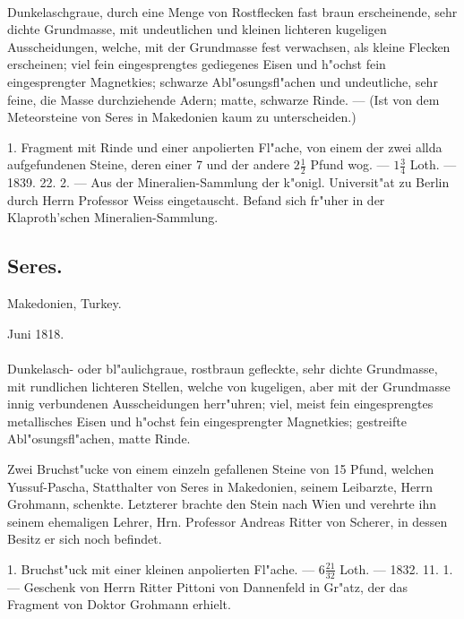 \documentclass[a4paper, 11pt, oneside, polutonikogreek, german]{article}
\begin{document}
\paragraph{}
Dunkelaschgraue, durch eine Menge von Rostflecken fast braun erscheinende, sehr dichte Grundmasse, mit undeutlichen und kleinen lichteren kugeligen Ausscheidungen, welche, mit der Grundmasse fest verwachsen, als kleine Flecken erscheinen; viel fein eingesprengtes gediegenes Eisen und h"ochst fein eingesprengter Magnetkies; schwarze Abl"osungsfl"achen und undeutliche, sehr feine, die Masse durchziehende Adern; matte, schwarze Rinde. --- (Ist von dem Meteorsteine von Seres in Makedonien kaum zu unterscheiden.)

1. Fragment mit Rinde und einer anpolierten Fl"ache, von einem der zwei allda aufgefundenen Steine, deren einer 7 und der andere $2\frac{1}{2}$ Pfund wog. --- $1\frac{3}{4}$ Loth. --- 1839. 22. 2. --- Aus der Mineralien-Sammlung der k"onigl. Universit"at zu Berlin durch Herrn Professor Weiss eingetauscht. Befand sich fr"uher in der Klaproth'schen Mineralien-Sammlung.
\subsection{Seres.}
\begin{center}
\small
Makedonien, Turkey.

Juni 1818.
\end{center}
\paragraph{}
Dunkelasch- oder bl"aulichgraue, rostbraun gefleckte, sehr dichte Grundmasse, mit rundlichen lichteren Stellen, welche von kugeligen, aber mit der Grundmasse innig verbundenen Ausscheidungen herr"uhren; viel, meist fein eingesprengtes metallisches Eisen und h"ochst fein eingesprengter Magnetkies; gestreifte Abl"osungsfl"achen, matte Rinde.

Zwei Bruchst"ucke von einem einzeln gefallenen Steine von 15 Pfund, welchen Yussuf-Pascha, Statthalter von Seres in Makedonien, seinem Leibarzte, Herrn Grohmann, schenkte. Letzterer brachte den Stein nach Wien und verehrte ihn seinem ehemaligen Lehrer, Hrn. Professor Andreas Ritter von Scherer, in dessen Besitz er sich noch befindet.

1. Bruchst"uck mit einer kleinen anpolierten Fl"ache. --- $6\frac{21}{32}$ Loth. --- 1832. 11. 1. --- Geschenk von Herrn Ritter Pittoni von Dannenfeld in Gr"atz, der das Fragment von Doktor Grohmann erhielt.
\end{document}
